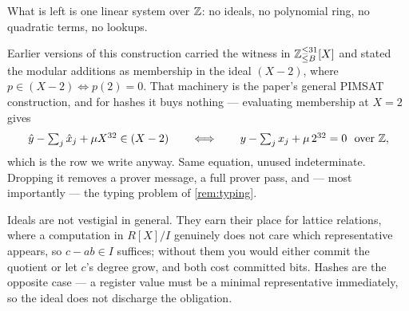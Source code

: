What is left is one linear system over $\mathbb{Z}$: no ideals, no polynomial ring, no
quadratic terms, no lookups.

\begin{center}
\label{fig:split}
\end{center}

\begin{remark}\label{rem:noideals}
Earlier versions of this construction carried the witness in $\mathbb{Z}^{\leq31}_{\leq
B}[X]$ and stated the modular additions as membership in the ideal $(X-2)$,
where $p\in(X-2)\iff p(2)=0$. That machinery is the paper's general
\textsc{PIMSAT} construction, and for hashes it buys nothing --- evaluating
membership at $X=2$ gives
\[
  \hat y - \textstyle\sum_j \hat x_j + \mu X^{32} \in (X-2)
  \qquad\Longleftrightarrow\qquad
  y - \textstyle\sum_j x_j + \mu\,2^{32} = 0 \ \text{ over } \mathbb{Z},
\]
which is the row we write anyway. Same equation, unused indeterminate. Dropping
it removes a prover message, a full prover pass, and --- most importantly --- the
typing problem of \cref{rem:typing}.

Ideals are not vestigial in general. They earn their place for lattice
relations, where a computation in $R[X]/I$ genuinely does not care which
representative appears, so $c-ab\in I$ suffices; without them you would either
commit the quotient or let $c$'s degree grow, and both cost committed bits.
Hashes are the opposite case --- a register value must be a minimal
representative immediately, so the ideal does not discharge the obligation.
\end{remark}

